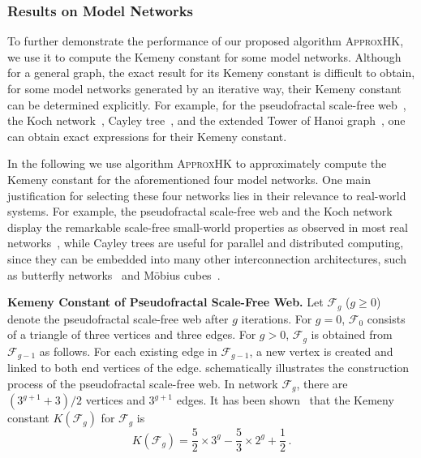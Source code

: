 \documentclass[10pt,twocolumn,twoside]{IEEEtran}
\begin{document}
\subsubsection{Results on Model Networks}

To further demonstrate the performance of our proposed algorithm \textsc{ApproxHK}, we use it to compute the Kemeny constant for some model networks.  Although for a general graph, the exact result for its  Kemeny constant is difficult to obtain, for some model networks generated by an iterative way, their Kemeny constant can be determined explicitly.
For example, for the pseudofractal scale-free web~\cite{XiZhCo16,ShLiZh17}, the Koch network~\cite{XiLiZh15}, Cayley tree~\cite{CaCh97,ChCa99}, and the extended Tower of Hanoi graph~\cite{KlMo05}, one can obtain exact expressions for their Kemeny constant.

In the following we use algorithm \textsc{ApproxHK} to approximately compute the Kemeny constant for the aforementioned four model networks. One main justification for selecting  these four networks lies in their relevance to real-world systems. For example,  the pseudofractal scale-free web and the Koch network display the remarkable scale-free small-world properties as observed in most real networks~\cite{Ne03}, while  Cayley trees are useful for parallel and distributed computing, since they can be embedded into many other interconnection architectures, such as butterfly networks~\cite{GuHa91} and M{\"o}bius cubes~\cite{LiFaJi16}.



\textbf{Kemeny Constant of Pseudofractal Scale-Free Web.} Let \(\mathcal{F}_g\) (\(g \geq 0\)) denote the pseudofractal scale-free web after \(g\) iterations. For \(g=0\), \( \mathcal{F}_0\) consists of a triangle of three vertices and three edges. For \(g>0\), \(\mathcal{F}_g\) is obtained from \(\mathcal{F}_{g-1}\) as follows. For each existing edge in \(\mathcal{F}_{g-1}\), a new vertex is created and linked to both end vertices of the edge.   schematically illustrates the construction process of the pseudofractal scale-free web. In network \(\mathcal{F}_g\), there are \((3^{g+1}+3)/2\) vertices and \(3^{g+1}\) edges.  It has been shown~\cite{XiZhCo16} that the Kemeny constant \(K(\mathcal{F}_g) \) for \(\mathcal{F}_g\) is
\begin{equation}\label{Kg01}
    K(\mathcal{F}_g)=\frac{5}{2}\times3^g-\frac{5}{3}\times2^g+\frac{1}{2}\,. %
\end{equation}
\end{document}
